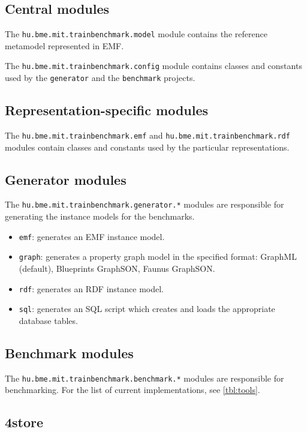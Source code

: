 \subsection{Central modules}

The \texttt{hu.bme.mit.trainbenchmark.model} module contains the reference metamodel represented in EMF.

The \texttt{hu.bme.mit.trainbenchmark.config} module contains classes and constants used by the \texttt{generator} and the \texttt{benchmark} projects.

\subsection{Representation-specific modules}

The \texttt{hu.bme.mit.trainbenchmark.emf} and \texttt{hu.bme.mit.trainbenchmark.rdf} modules contain classes and constants used by the particular representations.

\subsection{Generator modules}

The \texttt{hu.bme.mit.trainbenchmark.generator.*} modules are responsible for generating the instance models for the benchmarks.

\begin{itemize}
  \item \texttt{emf}: generates an EMF instance model.
  \item \texttt{graph}: generates a property graph model in the specified format: GraphML (default), Blueprints GraphSON, Faunus GraphSON.
  \item \texttt{rdf}: generates an RDF instance model.
  \item \texttt{sql}: generates an SQL script which creates and loads the appropriate database tables.
\end{itemize}


\subsection{Benchmark modules}

The \texttt{hu.bme.mit.trainbenchmark.benchmark.*} modules are responsible for benchmarking. For the list of current implementations, see \autoref{tbl:tools}.

\subsection{4store}

